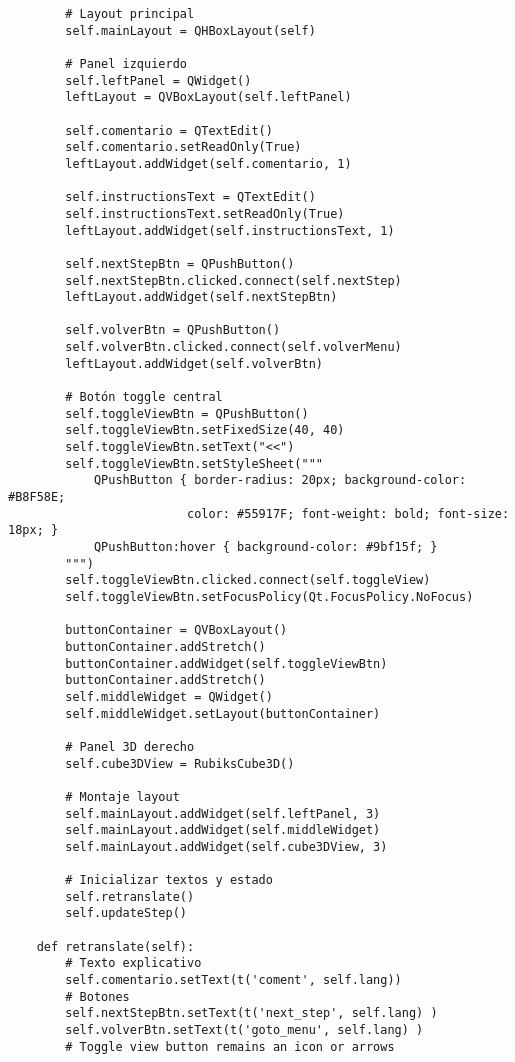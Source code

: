 \begin{lstlisting}
        # Layout principal
        self.mainLayout = QHBoxLayout(self)

        # Panel izquierdo
        self.leftPanel = QWidget()
        leftLayout = QVBoxLayout(self.leftPanel)

        self.comentario = QTextEdit()
        self.comentario.setReadOnly(True)
        leftLayout.addWidget(self.comentario, 1)

        self.instructionsText = QTextEdit()
        self.instructionsText.setReadOnly(True)
        leftLayout.addWidget(self.instructionsText, 1)

        self.nextStepBtn = QPushButton()
        self.nextStepBtn.clicked.connect(self.nextStep)
        leftLayout.addWidget(self.nextStepBtn)

        self.volverBtn = QPushButton()
        self.volverBtn.clicked.connect(self.volverMenu)
        leftLayout.addWidget(self.volverBtn)

        # Botón toggle central
        self.toggleViewBtn = QPushButton()
        self.toggleViewBtn.setFixedSize(40, 40)
        self.toggleViewBtn.setText("<<")
        self.toggleViewBtn.setStyleSheet("""
            QPushButton { border-radius: 20px; background-color: #B8F58E;
                         color: #55917F; font-weight: bold; font-size: 18px; }
            QPushButton:hover { background-color: #9bf15f; }
        """)
        self.toggleViewBtn.clicked.connect(self.toggleView)
        self.toggleViewBtn.setFocusPolicy(Qt.FocusPolicy.NoFocus)

        buttonContainer = QVBoxLayout()
        buttonContainer.addStretch()
        buttonContainer.addWidget(self.toggleViewBtn)
        buttonContainer.addStretch()
        self.middleWidget = QWidget()
        self.middleWidget.setLayout(buttonContainer)

        # Panel 3D derecho
        self.cube3DView = RubiksCube3D()

        # Montaje layout
        self.mainLayout.addWidget(self.leftPanel, 3)
        self.mainLayout.addWidget(self.middleWidget)
        self.mainLayout.addWidget(self.cube3DView, 3)

        # Inicializar textos y estado
        self.retranslate()
        self.updateStep()

    def retranslate(self):
        # Texto explicativo
        self.comentario.setText(t('coment', self.lang))
        # Botones
        self.nextStepBtn.setText(t('next_step', self.lang) )
        self.volverBtn.setText(t('goto_menu', self.lang) )
        # Toggle view button remains an icon or arrows


\end{lstlisting}
